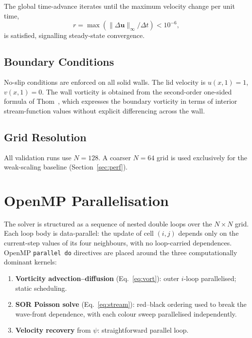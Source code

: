 \documentclass[conference]{IEEEtran}
\begin{document}
The global time-advance iterates until the maximum velocity change
per unit time,
\begin{equation}
  r = \max\!\left(\|\Delta\mathbf{u}\|_\infty / \Delta t\right) < 10^{-6},
  \label{eq:conv}
\end{equation}
is satisfied, signalling steady-state convergence.

\subsection{Boundary Conditions}

No-slip conditions are enforced on all solid walls.
The lid velocity is $u(x,1) = 1$, $v(x,1) = 0$.
The wall vorticity is obtained from the second-order one-sided formula of
Thom~\cite{ghia1982}, which expresses the boundary vorticity in terms of
interior stream-function values without explicit differencing across the wall.

\subsection{Grid Resolution}

All validation runs use $N = 128$.
A coarser $N = 64$ grid is used exclusively for the weak-scaling baseline
(Section~\ref{sec:perf}).

\section{OpenMP Parallelisation}
\label{sec:parallel}

The solver is structured as a sequence of nested double loops over the
$N\times N$ grid.
Each loop body is data-parallel: the update of cell $(i,j)$ depends only
on the current-step values of its four neighbours, with no loop-carried
dependences.
OpenMP \texttt{parallel do} directives are placed around the three
computationally dominant kernels:

\begin{enumerate}
  \item \textbf{Vorticity advection--diffusion} (Eq.~\ref{eq:vort}):
        outer $i$-loop parallelised; static scheduling.
  \item \textbf{SOR Poisson solve} (Eq.~\ref{eq:stream}):
        red--black ordering used to break the wave-front dependence,
        with each colour sweep parallelised independently.
  \item \textbf{Velocity recovery} from $\psi$:
        straightforward parallel loop.
\end{enumerate}
\end{document}
